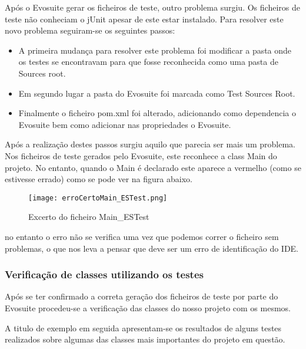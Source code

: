 \par Após o Evosuite gerar os ficheiros de teste, outro problema surgiu. Os ficheiros de teste não conheciam o jUnit apesar de este estar instalado. Para resolver este novo problema seguiram-se os seguintes passos:
\begin{itemize}
\item A primeira mudança para resolver este problema foi modificar a pasta onde os testes se encontravam para que fosse reconhecida como uma pasta de Sources root.
\item Em segundo lugar a pasta do Evosuite foi marcada como Test Sources Root.
\item Finalmente o ficheiro pom.xml foi alterado, adicionando como dependencia o Evosuite bem como adicionar nas propriedades o Evosuite.
\end{itemize}

\par Após a realização destes passos surgiu aquilo que parecia ser mais um problema. Nos ficheiros de teste gerados pelo Evosuite, este reconhece a class Main do projeto. No entanto, quando o Main é declarado este aparece a vermelho (como se estivesse errado) como se pode ver na figura abaixo.


\begin{figure}[H]

  \centering

  \texttt{[image: erroCertoMain\_ESTest.png]}

  \caption {Excerto do ficheiro Main\_ESTest}

  \label {fig38}

\end{figure}

\par no entanto o erro não se verifica uma vez que podemos correr o ficheiro sem problemas, o que nos leva a pensar que deve ser um erro de identificação do IDE.

\subsubsection{Verificação de classes utilizando os testes}

\par Após se ter confirmado a correta geração dos ficheiros de teste por parte do Evosuite procedeu-se a verificação das classes do nosso projeto com os mesmos.
\par A titulo de exemplo em seguida apresentam-se os resultados de alguns testes realizados sobre algumas das classes mais importantes do projeto em questão.

